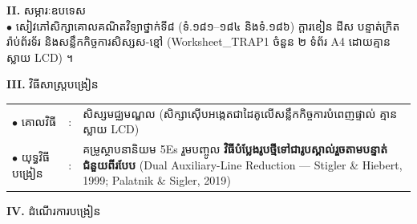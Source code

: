 \documentclass[a4paper,10pt]{article}
\newcommand{\en}[1]{{\TimesEn #1}}
\begin{document}
{\vspace{1pt}

\textbf{II.} {\muol សម្ភារៈឧបទេស}\\[1pt]
\hspace*{0.55cm}$\bullet$ \hspace{0.35cm} សៀវភៅសិក្សាគោលគណិតវិទ្យាថ្នាក់ទី៨ (ទំ.១៨១--១៨៤ និងទំ.១៨៦) ក្ដារខៀន ដីស បន្ទាត់ក្រិត រ៉ាប់ព័រទ័រ និងសន្លឹកកិច្ចការសិស្សស-ខ្មៅ (\en{Worksheet\_TRAP1} ចំនួន ២ ទំព័រ \en{A4} ដោយគ្មានស្លាយ \en{LCD}) ។

\vspace{1pt}

\textbf{III.} {\muol វិធីសាស្រ្តបង្រៀន}\\[1pt]
\hspace*{0.45cm}%
\begin{tabular}{@{}l l L{14.85cm}@{}}
  $\bullet$ \hspace{0.25cm} គោលវិធី & : & សិស្សមជ្ឈមណ្ឌល (សិក្សាស៊ើបអង្កេតជាដៃគូលើសន្លឹកកិច្ចការបំពេញផ្ទាល់ គ្មានស្លាយ \en{LCD}) \\
  $\bullet$ \hspace{0.25cm} យុទ្ធវិធីបង្រៀន & : & គម្រូស្ថាបនានិយម \en{5Es} រួមបញ្ចូល \textbf{វិធីបំប្លែងរូបថ្មីទៅជារូបស្គាល់រួចតាមបន្ទាត់ជំនួយពីរបែប} (\en{Dual Auxiliary-Line Reduction — Stigler \& Hiebert, 1999; Palatnik \& Sigler, 2019}) \\
\end{tabular}
}

\vspace{1pt}

\textbf{IV.} {\muol ដំណើរការបង្រៀន}

\vspace{1pt}
\end{document}
